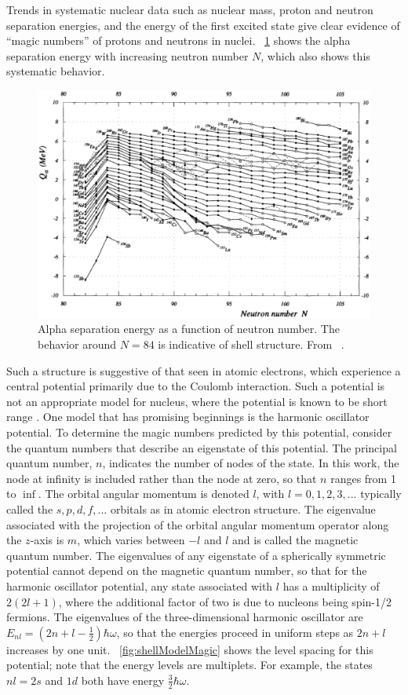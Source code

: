 Trends in systematic nuclear data such as nuclear mass, proton and neutron separation energies, and the energy of the first excited state give clear evidence of ``magic numbers'' of protons and neutrons in nuclei.  {\fig}~\ref{fig:alphaSep} shows the alpha separation energy with increasing neutron number $N$, which also shows this systematic behavior.  
\begin{figure}[htp]
\centering
\includegraphics[height=0.8\textheight]{figures/alphaSepEnergy.eps}
\caption{Alpha separation energy as a function of neutron number.  The behavior around $N=84$ is indicative of shell structure.  From {}~\cite{massEval_1993}.}
\label{fig:alphaSep}
\end{figure}
Such a structure is suggestive of that seen in atomic electrons, which experience a central potential primarily due to the Coulomb interaction.  Such a potential is not an appropriate model for nucleus, where the potential is known to be short range \citep{Casten}.  One model that has promising beginnings is the harmonic oscillator potential.  To determine the magic numbers predicted by this potential, consider the quantum numbers that describe an eigenstate of this potential.  The principal quantum number, $n$, indicates the number of nodes of the state.  In this work, the node at infinity is included rather than the node at zero, so that $n$ ranges from 1 to $\inf$.  The orbital angular momentum is denoted $l$, with $l = 0, 1, 2, 3, ...$ typically called the $s, p, d, f, ...$ orbitals as in atomic electron structure.  The eigenvalue associated with the projection of the orbital angular momentum operator along the $z$-axis is $m$, which varies between $-l$ and $l$ and is called the magnetic quantum number.  The eigenvalues of any eigenstate of a spherically symmetric potential cannot depend on the magnetic quantum number, so that for the harmonic oscillator potential, any state associated with $l$ has a multiplicity of $2(2l+1)$, where the additional factor of two is due to nucleons being spin-1/2 fermions.  The eigenvalues of the three-dimensional harmonic oscillator are $E_{nl} = (2n+l-\frac{1}{2})\hbar\omega$, so that the energies proceed in uniform steps as $2n+l$ increases by one unit.  {\fig}~\ref{fig:shellModelMagic} shows the level spacing for this potential; note that the energy levels are multiplets.  For example, the states $nl = 2s$ and $1d$ both have energy $\frac{3}{2}\hbar\omega$.  
